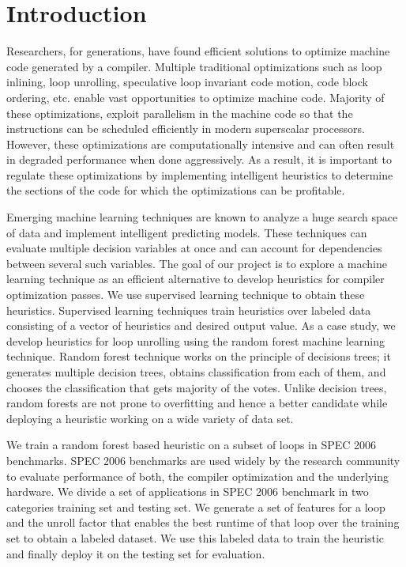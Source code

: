 \documentclass[]{sig-alternate}
\begin{document}
\section{Introduction}\label{sec:intro}
Researchers, for generations, have found efficient solutions to optimize machine code generated by a compiler. Multiple traditional optimizations such as loop inlining, loop unrolling, speculative loop invariant code motion, code block ordering, etc. enable vast opportunities to optimize machine code. Majority of these optimizations, exploit parallelism in the machine code so that the instructions can be scheduled efficiently in modern superscalar processors. However, these optimizations are computationally intensive and can often result in degraded performance when done aggressively. As a result, it is important to regulate these optimizations by implementing intelligent heuristics to determine the sections of the code for which the optimizations can be profitable.

Emerging machine learning techniques are known to analyze a huge search space of data and implement intelligent predicting models. These techniques can evaluate multiple decision variables at once and can account for dependencies between several such variables. The goal of our project is to explore a machine learning technique as an efficient alternative to develop heuristics for compiler optimization passes. We use supervised learning technique to obtain these heuristics. Supervised learning techniques train heuristics over labeled data consisting of a vector of heuristics and desired output value. As a case study, we develop heuristics for loop unrolling using the random forest machine learning technique.
Random forest technique works on the principle of decisions trees; it generates multiple decision trees, obtains classification from each of them, and chooses the classification that gets majority of the votes. Unlike decision trees, random forests are not prone to overfitting and hence a better candidate while deploying a heuristic working on a wide variety of data set.

We train a random forest based heuristic on a subset of loops in SPEC 2006 benchmarks. SPEC 2006 benchmarks are used widely by the research community to evaluate performance of both, the compiler optimization and the underlying hardware. We divide a set of applications in SPEC 2006 benchmark in two categories  training set and testing set. We generate a set of features for a loop and the unroll factor that enables the best runtime of that loop over the training set to obtain a labeled dataset. We use this labeled data to train the heuristic and finally deploy it on the testing set for evaluation.
\end{document}
